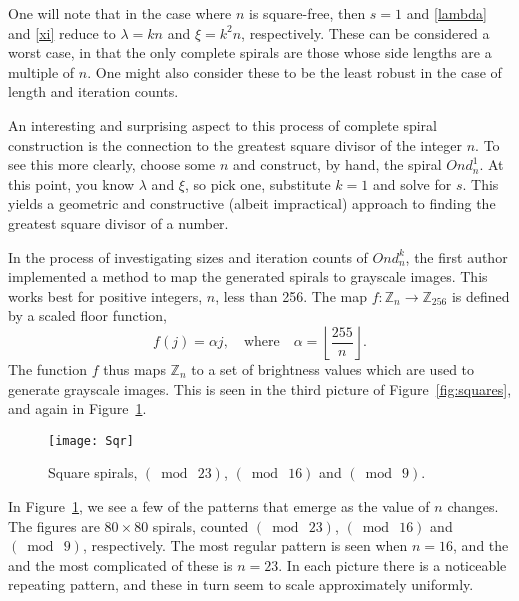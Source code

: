 \documentclass{article}
\theoremstyle{definition}
\def\ZZ{\mathbb{Z}}
\def\pmod#1{(\bmod\  #1)}
\begin{document}
One will note that in the case where $n$ is square-free, then $s=1$
and \eqref{lambda} and \eqref{xi} reduce to $\lambda = k n$ and $\xi =
k^2 n$, respectively.  These can be considered a worst case, in that
the only complete spirals are those whose side lengths are a multiple
of $n$.  One might also consider these to be the least robust in the
case of length and iteration counts.

An interesting and surprising aspect to this process of complete
spiral construction is the connection to the greatest square divisor
of the integer $n$.  To see this more clearly, choose some $n$ and
construct, by hand, the spiral $Ond^1_n$.  At this point, you know
$\lambda$ and $\xi$, so pick one, substitute $k = 1$ and solve for
$s$.  This yields a geometric and constructive (albeit impractical)
approach to finding the greatest square divisor of a number.

In the process of investigating sizes and iteration counts of
$Ond^k_n$, the first author implemented a method to map the generated
spirals to grayscale images. This works best for positive integers,
$n$, less than 256.  The map $f : \ZZ_n \to \ZZ_{256}$ is defined by a
scaled floor function,
\begin{equation}
   f(j) = \alpha j, \quad \text{where} \quad
   \alpha = \left\lfloor \frac{255}n \right\rfloor.
\label{grayscale}
\end{equation}
The function $f$ thus maps $\ZZ_n$ to a set of brightness values which
are used to generate grayscale images.  This is seen in the third
picture of Figure~\ref{fig:squares}, and again in Figure~\ref{fig:bigsquares}.

\begin{figure}[htb]
  \centering
  \texttt{[image: Sqr]}
  \caption{Square spirals, $\pmod{23}$, $\pmod{16}$ and $\pmod{9}$.}
  \label{fig:bigsquares}
\end{figure}

In Figure~\ref{fig:bigsquares}, we see a few of the patterns that
emerge as the value of $n$ changes.  The figures are $80\times80$
spirals, counted  $\pmod{23}$, $\pmod{16}$ and $\pmod{9}$,
respectively.  The most regular pattern is seen when $n=16$, and the
and the most complicated of these is $n=23$.  In each
picture there is a noticeable repeating pattern, and these in turn seem
to scale approximately uniformly.
\end{document}
